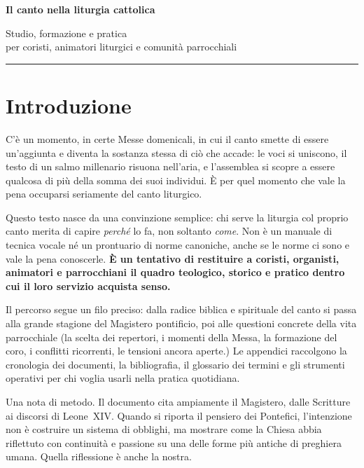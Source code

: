 \documentclass[12pt,a4paper]{article}
\begin{document}
	
	\hypersetup{pageanchor=false}
	\begin{titlepage}
		\centering
		\vspace*{3cm}
		{\LARGE\bfseries Il canto nella liturgia cattolica\par}
		\vspace{1.2cm}
		{\large Studio, formazione e pratica\\per coristi, animatori liturgici e comunità parrocchiali\par}
		\vspace{2cm}
		\rule{0.5\linewidth}{0.5pt}
	\end{titlepage}
	\hypersetup{pageanchor=true}
	\tableofcontents
	\newpage
	
	\section*{Introduzione}
	
	C'è un momento, in certe Messe domenicali, in cui il canto smette di essere
	un'aggiunta e diventa la sostanza stessa di ciò che accade: le voci si uniscono,
	il testo di un salmo millenario risuona nell'aria, e l'assemblea si scopre a
	essere qualcosa di più della somma dei suoi individui. È per quel momento che
	vale la pena occuparsi seriamente del canto liturgico.
	
	Questo testo nasce da una convinzione semplice: chi serve la liturgia col
	proprio canto merita di capire \emph{perché} lo fa, non soltanto \emph{come}.
	Non è un manuale di tecnica vocale né un prontuario di norme canoniche, anche se
	le norme ci sono e vale la pena conoscerle. \textbf{È un tentativo di restituire a
		coristi, organisti, animatori e parrocchiani il quadro teologico, storico e
		pratico dentro cui il loro servizio acquista senso.}
	
	Il percorso segue un filo preciso: dalla radice biblica e spirituale del canto
	si passa alla grande stagione del Magistero pontificio, poi alle questioni
	concrete della vita parrocchiale (la scelta dei repertori, i momenti della
	Messa, la formazione del coro, i conflitti ricorrenti, le tensioni ancora aperte.)
	Le appendici raccolgono la cronologia dei documenti, la bibliografia, il
	glossario dei termini e gli strumenti operativi per chi voglia usarli nella
	pratica quotidiana.
	
	Una nota di metodo. Il documento cita ampiamente il Magistero, dalle Scritture
	ai discorsi di Leone~XIV. Quando si riporta il pensiero dei Pontefici,
	l'intenzione non è costruire un sistema di obblighi, ma mostrare come la Chiesa
	abbia riflettuto con continuità e passione su una delle forme più antiche di
	preghiera umana. Quella riflessione è anche la nostra.
	
\end{document}
